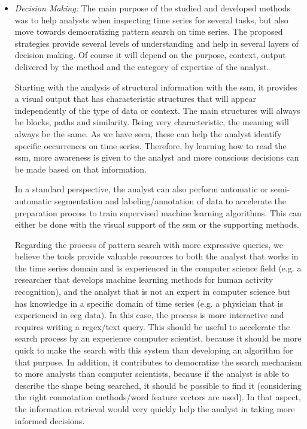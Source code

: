 \begin{itemize}
\item \textit{Decision Making:} The main purpose of the studied and developed methods was to help analysts when inspecting time series for several tasks, but also move towards democratizing pattern search on time series. The proposed strategies provide several levels of understanding and help in several layers of decision making. Of course it will depend on the purpose, context, output delivered by the method and the category of expertise of the analyst.
\par
Starting with the analysis of structural information with the \gls{ssm}, it provides a visual output that has characteristic structures that will appear independently of the type of data or context. The main structures will always be blocks, paths and similarity. Being very characteristic, the meaning will always be the same. As we have seen, these can help the analyst identify specific occurrences on time series. Therefore, by learning how to read the \gls{ssm}, more awareness is given to the analyst and more conscious decisions can be made based on that information.
\par
In a standard perspective, the analyst can also perform automatic or semi-automatic segmentation and labeling/annotation of data to accelerate the preparation process to train supervised machine learning algorithms. This can either be done with the visual support of the \gls{ssm} or the supporting methods.
\par
Regarding the process of pattern search with more expressive queries, we believe the tools provide valuable resources to both the analyst that works in the time series domain and is experienced in the computer science field (e.g. a researcher that develops machine learning methods for human activity recognition), and the analyst that is not an expert in computer science but has knowledge in a specific domain of time series (e.g. a physician that is experienced in \gls{ecg} data). In this case, the process is more interactive and requires writing a \gls{regex}/text query. This should be useful to accelerate the search process by an experience computer scientist, because it should be more quick to make the search with this system than developing an algorithm for that purpose. In addition, it contributes to democratize the search mechanism to more analysts than computer scientists, because if the analyst is able to describe the shape being searched, it should be possible to find it (considering the right connotation methods/word feature vectors are used). In that aspect, the information retrieval would very quickly help the analyst in taking more informed decisions.
\end{itemize}


